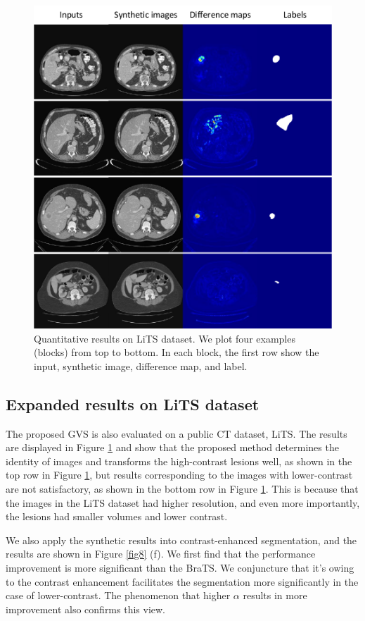 \documentclass[journal,twoside,web]{ieeecolor}
\begin{document}
\begin{figure}
	\centering
	\includegraphics[width=\columnwidth]{./figs/result2.pdf}
	\caption{Quantitative results on LiTS dataset. We plot four examples (blocks) from top to bottom. In each block, the first row show the input, synthetic image, difference map, and label.}
	\label{fig10}
\end{figure}

\subsection{Expanded results on LiTS dataset} \label{sec59}
The proposed GVS is also evaluated on a public CT dataset, LiTS. The results are displayed in Figure \ref{fig10} and show that the proposed method determines the identity of images and transforms the high-contrast lesions well, as shown in the top row in Figure \ref{fig10}, but results corresponding to the images with lower-contrast are not satisfactory, as shown in the bottom row in Figure \ref{fig10}. This is because that the images in the LiTS dataset had higher resolution, and even more importantly, the lesions had smaller volumes and lower contrast. 

We also apply the synthetic results into contrast-enhanced segmentation, and the results are shown in Figure \ref{fig8} (f). We first find that the performance improvement is more significant than the BraTS. We conjuncture that it's owing to the contrast enhancement facilitates the segmentation more significantly in the case of lower-contrast. The phenomenon that higher $\alpha$ results in more improvement also confirms this view.
\end{document}
